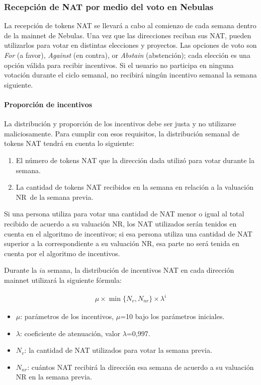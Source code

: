 \subsubsection{Recepción de NAT por medio del voto \onchain en Nebulas}

La recepción de tokens NAT se llevará a cabo al comienzo de cada semana dentro de la mainnet de Nebulas. Una vez que las direcciones reciban sus NAT, pueden utilizarlos para votar en distintas elecciones y proyectos. Las opciones de voto son \textit{For} (a favor), \textit{Against} (en contra), or \textit{Abstain} (abstención); cada elección es una opción válida para recibir incentivos. Si el usuario no participa en ninguna votación durante el ciclo semanal, no recibirá ningún incentivo semanal la semana siguiente.

\paragraph{Proporción de incentivos}

La distribución y proporción de los incentivos debe ser justa y no utilizarse maliciosamente. Para cumplir con esos requisitos, la distribución semanal de tokens NAT tendrá en cuenta lo siguiente:

\begin{enumerate}
	\item El número de tokens NAT que la dirección dada utilizó para votar durante la semana.
	\item La cantidad de tokens NAT recibidos en la semana en relación a la valuación NR de la semana previa.
\end{enumerate}

Si una persona utiliza para votar una cantidad de NAT menor o igual al total recibido de acuerdo a su valuación NR, los NAT utilizados serán tenidos en cuenta en el algoritmo de incentivos; si esa persona utiliza una cantidad de NAT superior a la correspondiente a su valuación NR, esa parte no será tenida en cuenta por el algoritmo de incentivos.

Durante la $i$a semana, la distribución de incentivos NAT en cada dirección mainnet utilizará la siguiente fórmula:

\begin{align}
\mu \times \min \{N_{v}, N_{nr}\} \times \lambda^{i}
\end{align}

\begin{itemize}
	\item $\mu$: parámetros de los incentivos, $\mu$=10 bajo los parámetros iniciales.
	\item $\lambda$: coeficiente de atenuación, valor $\lambda$=0,997.
	\item $N_{v}$: la cantidad de NAT utilizados para votar la semana previa.
	\item $N_{nr}$: cuántos NAT recibirá la dirección esa semana de acuerdo a su valuación NR en la semana previa.
\end{itemize}

